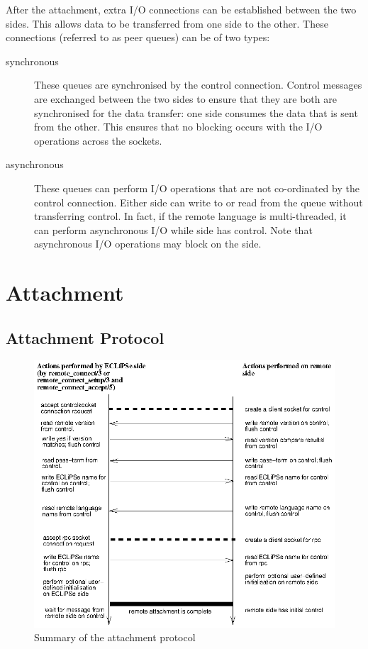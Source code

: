 After the attachment, extra I/O connections can be established between the
two sides. This allows data to be transferred from one side to the other.
These connections (referred to as peer queues) can be of two types:

\begin{description}
\item[synchronous] These queues are synchronised by the control
connection. Control messages are exchanged between the two sides to ensure
that they are both are synchronised for the data transfer: one side
consumes the data that is sent from the other. This ensures that no
blocking occurs with the I/O operations across the sockets.

\item[asynchronous] These queues can perform I/O operations that are not
 co-ordinated by the control 
connection. Either side can write to or read from the queue 
without transferring control. In fact, if the remote language is
multi-threaded, it can perform asynchronous I/O while {\eclipse}
side has control. Note that asynchronous I/O
operations may block on the {\eclipse} side. 

\end{description}

\section{Attachment}
\label{remoteattach}
\subsection{Attachment Protocol}

\begin{figure}[hbt]
\begin{center}
\includegraphics{remoteconnect.ps}
\end{center}
\caption{Summary of the attachment protocol}
\label{rattach}
\end{figure}


